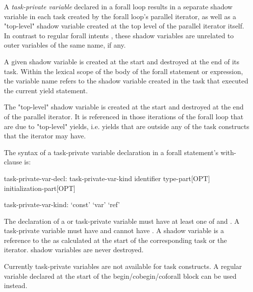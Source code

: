 A \emph{task-private variable} declared in a forall loop results
in a separate shadow variable in each task created by the forall
loop's parallel iterator, as well as a "top-level" shadow variable
created at the top level of the parallel iterator itself.
In contrast to regular forall intents ,
these shadow variables are unrelated to outer variables
of the same name, if any.

A given shadow variable is created at the start and destroyed
at the end of its task.
Within the lexical scope of the body of the forall statement or expression,
the variable name refers to the shadow variable created in the task
that executed the current yield statement.

The "top-level" shadow variable is created at the start and destroyed
at the end of the parallel iterator. It is referenced in those iterations
of the forall loop that are due to "top-level" yields, i.e. yields
that are outside any of the task constructs that the iterator may have.

The syntax of a task-private variable declaration in a forall statement's
with-clause is:

\begin{syntax}
task-private-var-decl:
  task-private-var-kind identifier type-part[OPT] initialization-part[OPT]

task-private-var-kind:
  `const'
  `var'
  `ref'
\end{syntax}

The declaration of a  or  task-private variable must
have at least one of  and .
A  task-private variable must have 
and cannot have . A  shadow variable
is a reference to the  as calculated at
the start of the corresponding task or the iterator.
 shadow variables are never destroyed.

\begin{craychapel}
Currently task-private variables are not available for task constructs.
A regular variable declared at the start of the begin/cobegin/coforall
block can be used instead.
\end{craychapel}

